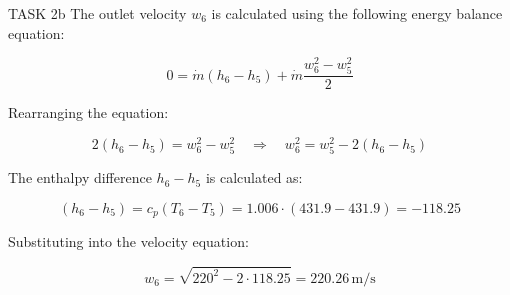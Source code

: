 TASK 2b  
The outlet velocity \( w_6 \) is calculated using the following energy balance equation:  

\[
0 = \dot{m} (h_6 - h_5) + \dot{m} \frac{w_6^2 - w_5^2}{2}
\]

Rearranging the equation:  

\[
2(h_6 - h_5) = w_6^2 - w_5^2 \quad \Rightarrow \quad w_6^2 = w_5^2 - 2(h_6 - h_5)
\]

The enthalpy difference \( h_6 - h_5 \) is calculated as:  

\[
(h_6 - h_5) = c_p (T_6 - T_5) = 1.006 \cdot (431.9 - 431.9) = -118.25
\]

Substituting into the velocity equation:  

\[
w_6 = \sqrt{220^2 - 2 \cdot 118.25} = 220.26 \, \text{m/s}
\]